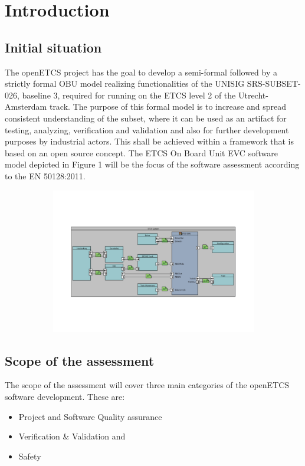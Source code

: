 \section{Introduction}
\subsection{Initial situation}
The openETCS project has the goal to develop a semi-formal followed by a strictly formal OBU model realizing
functionalities of the UNISIG SRS-SUBSET-026, baseline 3, required for running on the ETCS level 2 of the
Utrecht-Amsterdam track. The purpose of this formal model is to increase and spread consistent understanding of the
subset, where it can be used as an artifact for testing, analyzing, verification and validation and also for further
development purposes by industrial actors. This shall be achieved within a framework that is based on an open source
concept. The ETCS On Board Unit EVC software model depicted in Figure 1 will be the focus of the software assessment
according to the EN 50128:2011.


\begin{figure}
\label{toplevelarchitecture} 
\centering
\includegraphics[width=14.552cm,height=6.35cm]{../images/toplevelarchitecture2.pdf}
\end{figure}



\bigskip

\subsection{Scope of the assessment}
The scope of the assessment will cover three main categories of the openETCS software development. These are:

\begin{itemize}
\item Project and Software Quality assurance 
\item Verification \& Validation and 
\item Safety 
\end{itemize}

